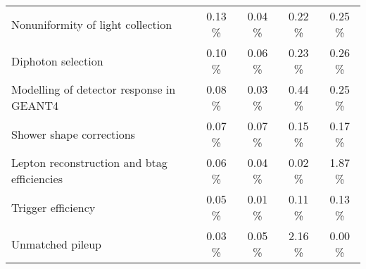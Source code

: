 {\begin{tabular} { |l |  c |  c |  c |  c |  }
   Nonuniformity of light collection  &  0.13 \% &  0.04 \% &  0.22 \% &  0.25 \% \\
   Diphoton selection  &  0.10 \% &  0.06 \% &  0.23 \% &  0.26 \% \\
   Modelling of detector response in GEANT4  &  0.08 \% &  0.03 \% &  0.44 \% &  0.25 \% \\
   Shower shape corrections  &  0.07 \% &  0.07 \% &  0.15 \% &  0.17 \% \\
   Lepton reconstruction and btag efficiencies  &  0.06 \% &  0.04 \% &  0.02 \% &  1.87 \% \\
   Trigger efficiency  &  0.05 \% &  0.01 \% &  0.11 \% &  0.13 \% \\
   Unmatched pileup  &  0.03 \% &  0.05 \% &  2.16 \% &  0.00 \% \\
   \hline
   \end{tabular}}

